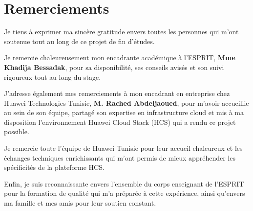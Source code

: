 \chapter*{Remerciements}

Je tiens à exprimer ma sincère gratitude envers toutes les personnes qui m'ont
soutenue tout au long de ce projet de fin d'études.

Je remercie chaleureusement mon encadrante académique à l'ESPRIT,
\textbf{Mme Khadija Bessadak}, pour sa disponibilité, ses conseils avisés et son
suivi rigoureux tout au long du stage.

J'adresse également mes remerciements à mon encadrant en entreprise chez Huawei
Technologies Tunisie, \textbf{M. Rached Abdeljaoued}, pour m'avoir accueillie au
sein de son équipe, partagé son expertise en infrastructure cloud et mis à ma
disposition l'environnement Huawei Cloud Stack (HCS) qui a rendu ce projet possible.

Je remercie toute l'équipe de Huawei Tunisie pour leur accueil chaleureux et les
échanges techniques enrichissants qui m'ont permis de mieux appréhender les
spécificités de la plateforme HCS.

Enfin, je suis reconnaissante envers l'ensemble du corps enseignant de l'ESPRIT
pour la formation de qualité qui m'a préparée à cette expérience, ainsi qu'envers
ma famille et mes amis pour leur soutien constant.

\clearpage
